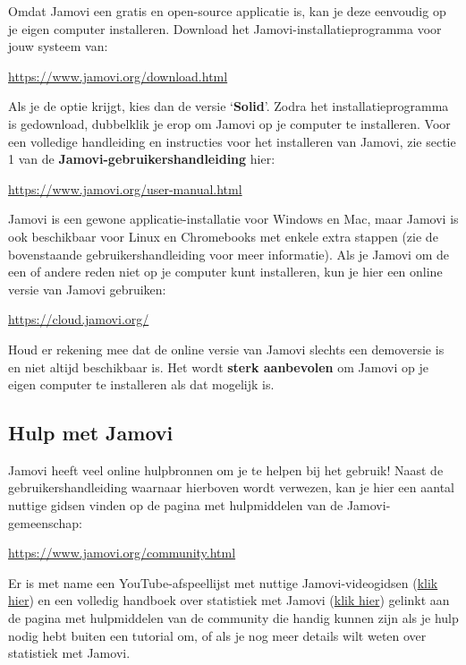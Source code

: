 \documentclass[
  letterpaper,
  DIV=11,
  numbers=noendperiod]{scrartcl}
\begin{document}
Omdat Jamovi een gratis en open-source applicatie is, kan je deze
eenvoudig op je eigen computer installeren. Download het
Jamovi-installatieprogramma voor jouw systeem van:

\url{https://www.jamovi.org/download.html}

Als je de optie krijgt, kies dan de versie `\textbf{Solid}'. Zodra het
installatieprogramma is gedownload, dubbelklik je erop om Jamovi op je
computer te installeren. Voor een volledige handleiding en instructies
voor het installeren van Jamovi, zie sectie 1 van de
\textbf{Jamovi-gebruikershandleiding} hier:

\url{https://www.jamovi.org/user-manual.html}

Jamovi is een gewone applicatie-installatie voor Windows en Mac, maar
Jamovi is ook beschikbaar voor Linux en Chromebooks met enkele extra
stappen (zie de bovenstaande gebruikershandleiding voor meer
informatie). Als je Jamovi om de een of andere reden niet op je computer
kunt installeren, kun je hier een online versie van Jamovi gebruiken:

\url{https://cloud.jamovi.org/}

\begin{tcolorbox}[beforeafter skip=1cm, ignore nobreak=true, breakable, colframe=Aside-frame, colback=Aside-bg, coltext=Aside-text, boxsep=2mm, arc=0mm, boxrule=0.5mm]

Houd er rekening mee dat de online versie van Jamovi slechts een
demoversie is en niet altijd beschikbaar is. Het wordt \textbf{sterk
aanbevolen} om Jamovi op je eigen computer te installeren als dat
mogelijk is.

\end{tcolorbox}

\hypertarget{hulp-met-jamovi}{%
\subsection{Hulp met Jamovi}\label{hulp-met-jamovi}}

Jamovi heeft veel online hulpbronnen om je te helpen bij het gebruik!
Naast de gebruikershandleiding waarnaar hierboven wordt verwezen, kan je
hier een aantal nuttige gidsen vinden op de pagina met hulpmiddelen van
de Jamovi-gemeenschap:

\url{https://www.jamovi.org/community.html}

Er is met name een YouTube-afspeellijst met nuttige Jamovi-videogidsen
(\href{https://bit.ly/jamovi-youtube}{klik hier}) en een volledig
handboek over statistiek met Jamovi
(\href{https://www.learnstatswithjamovi.com/}{klik hier}) gelinkt aan de
pagina met hulpmiddelen van de community die handig kunnen zijn als je
hulp nodig hebt buiten een tutorial om, of als je nog meer details wilt
weten over statistiek met Jamovi.
\end{document}
